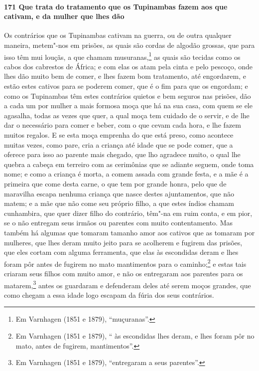 \paragraph{171 Que trata do tratamento que os Tupinambas fazem aos que cativam, e da
mulher que lhes dão}

Os contrários que os Tupinambas cativam na guerra, ou de outra qualquer maneira, metem"-nos
em prisões, as quais são cordas de algodão grossas, que para isso têm mui louçãs, a que
chamam musuranas,\footnote{ Em Varnhagen (1851 e 1879), ``muçuranas''.} as quais são
tecidas como os cabos dos cabrestos de África; e com elas os atam pela cinta e pelo
pescoço, onde lhes dão muito bem de comer, e lhes fazem bom tratamento, até engordarem, e
estão estes cativos para se poderem comer, que é o fim para que os engordam; e como os
Tupinambas têm estes contrários quietos e bem seguros nas prisões, dão a cada um por
mulher a mais formosa moça que há na sua casa, com quem se ele agasalha, todas as vezes
que quer, a qual moça tem cuidado de o servir, e de lhe dar o necessário para comer e
beber, com o que cevam cada hora, e lhe fazem muitos regalos. E se esta moça emprenha do
que está preso, como acontece muitas vezes, como pare, cria a criança até idade que se
pode comer, que a oferece para isso ao parente mais chegado, que lho agradece muito, o
qual lhe quebra a cabeça em terreiro com as cerimônias que se adiante seguem, onde toma
nome; e como a criança é morta, a comem assada com grande festa, e a mãe é a primeira que
come desta carne, o que tem por grande honra, pelo que de maravilha escapa nenhuma criança
que nasce destes ajuntamentos, que não matem; e a mãe que não come seu próprio filho, a
que estes índios chamam cunhambira, que quer dizer filho do contrário, têm"-na em ruim
conta, e em pior, se o não entregam seus irmãos ou parentes com muito contentamento. Mas
também há algumas que tomaram tamanho amor aos cativos que as tomaram por mulheres, que
lhes deram muito jeito para se acolherem e fugirem das prisões, que eles cortam com alguma
ferramenta, que elas às escondidas deram e lhes foram pôr antes de fugirem no mato
mantimentos para o caminho;\footnote{ Em Varnhagen (1851 e 1879), `` às escondidas lhes
deram, e lhes foram pôr no mato, antes de fugirem, mantimentos''.} e estas tais criaram
seus filhos com muito amor, e não os entregaram aos parentes para os matarem,\footnote{ Em
Varnhagen (1851 e 1879), ``entregaram a seus parentes''.} antes os guardaram e defenderam
deles até serem moços grandes, que como chegam a essa idade logo escapam da fúria dos seus
contrários.

